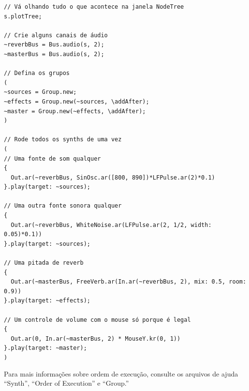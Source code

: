 \begin{lstlisting}[style=SuperCollider-IDE, basicstyle=\scttfamily\footnotesize]
// Vá olhando tudo o que acontece na janela NodeTree
s.plotTree;

// Crie alguns canais de áudio
~reverbBus = Bus.audio(s, 2);
~masterBus = Bus.audio(s, 2);

// Defina os grupos
(
~sources = Group.new;
~effects = Group.new(~sources, \addAfter);
~master = Group.new(~effects, \addAfter);
)

// Rode todos os synths de uma vez
(
// Uma fonte de som qualquer
{
  Out.ar(~reverbBus, SinOsc.ar([800, 890])*LFPulse.ar(2)*0.1)
}.play(target: ~sources);

// Uma outra fonte sonora qualquer
{
  Out.ar(~reverbBus, WhiteNoise.ar(LFPulse.ar(2, 1/2, width: 0.05)*0.1))
}.play(target: ~sources);

// Uma pitada de reverb
{
  Out.ar(~masterBus, FreeVerb.ar(In.ar(~reverbBus, 2), mix: 0.5, room: 0.9))
}.play(target: ~effects);

// Um controle de volume com o mouse só porque é legal
{
  Out.ar(0, In.ar(~masterBus, 2) * MouseY.kr(0, 1))
}.play(target: ~master);
)
\end{lstlisting}

Para mais informações sobre ordem de execução, consulte os arquivos de ajuda ``Synth'', ``Order of Execution'' e ``Group.''
